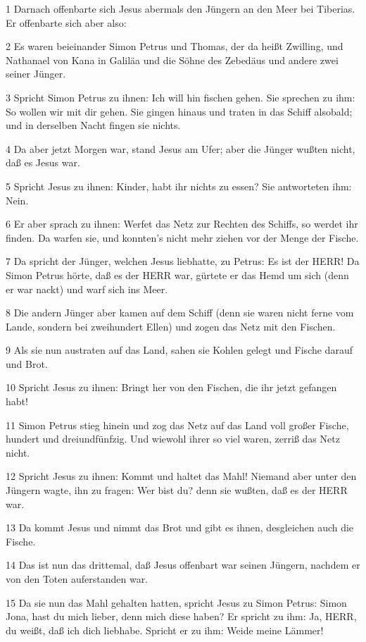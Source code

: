 \par 1 Darnach offenbarte sich Jesus abermals den Jüngern an den Meer bei Tiberias. Er offenbarte sich aber also:
\par 2 Es waren beieinander Simon Petrus und Thomas, der da heißt Zwilling, und Nathanael von Kana in Galiläa und die Söhne des Zebedäus und andere zwei seiner Jünger.
\par 3 Spricht Simon Petrus zu ihnen: Ich will hin fischen gehen. Sie sprechen zu ihm: So wollen wir mit dir gehen. Sie gingen hinaus und traten in das Schiff alsobald; und in derselben Nacht fingen sie nichts.
\par 4 Da aber jetzt Morgen war, stand Jesus am Ufer; aber die Jünger wußten nicht, daß es Jesus war.
\par 5 Spricht Jesus zu ihnen: Kinder, habt ihr nichts zu essen? Sie antworteten ihm: Nein.
\par 6 Er aber sprach zu ihnen: Werfet das Netz zur Rechten des Schiffs, so werdet ihr finden. Da warfen sie, und konnten's nicht mehr ziehen vor der Menge der Fische.
\par 7 Da spricht der Jünger, welchen Jesus liebhatte, zu Petrus: Es ist der HERR! Da Simon Petrus hörte, daß es der HERR war, gürtete er das Hemd um sich (denn er war nackt) und warf sich ins Meer.
\par 8 Die andern Jünger aber kamen auf dem Schiff (denn sie waren nicht ferne vom Lande, sondern bei zweihundert Ellen) und zogen das Netz mit den Fischen.
\par 9 Als sie nun austraten auf das Land, sahen sie Kohlen gelegt und Fische darauf und Brot.
\par 10 Spricht Jesus zu ihnen: Bringt her von den Fischen, die ihr jetzt gefangen habt!
\par 11 Simon Petrus stieg hinein und zog das Netz auf das Land voll großer Fische, hundert und dreiundfünfzig. Und wiewohl ihrer so viel waren, zerriß das Netz nicht.
\par 12 Spricht Jesus zu ihnen: Kommt und haltet das Mahl! Niemand aber unter den Jüngern wagte, ihn zu fragen: Wer bist du? denn sie wußten, daß es der HERR war.
\par 13 Da kommt Jesus und nimmt das Brot und gibt es ihnen, desgleichen auch die Fische.
\par 14 Das ist nun das drittemal, daß Jesus offenbart war seinen Jüngern, nachdem er von den Toten auferstanden war.
\par 15 Da sie nun das Mahl gehalten hatten, spricht Jesus zu Simon Petrus: Simon Jona, hast du mich lieber, denn mich diese haben? Er spricht zu ihm: Ja, HERR, du weißt, daß ich dich liebhabe. Spricht er zu ihm: Weide meine Lämmer!
